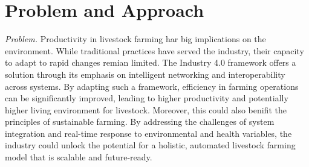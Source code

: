\section{Problem and Approach}

\label{sec:problem}
\emph{Problem.}
Productivity in livestock farming har big implications on the environment. While traditional practices have served the industry, their capacity to adapt to rapid changes remian limited. The Industry 4.0 framework offers a solution through its emphasis on intelligent networking and interoperability across systems. By adapting such a framework, efficiency in farming operations can be significantly improved, leading to higher productivity and potentially higher living environment for livestock. Moreover, this could also benifit the principles of sustainable farming. By addressing the challenges of system integration and real-time response to environmental and health variables, the industry could unlock the potential for a holistic, automated livestock farming model that is scalable and future-ready. \vspace{1mm} \newline



